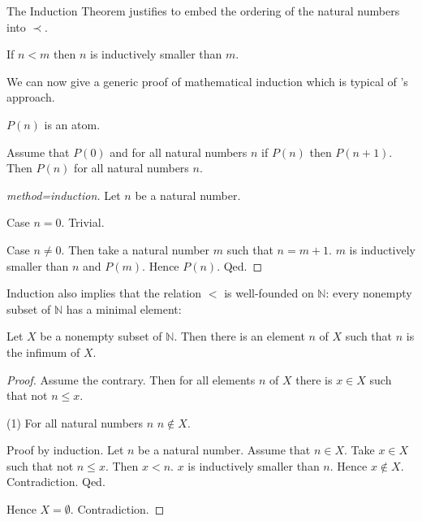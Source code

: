\documentclass{article}
\begin{document}
%
The Induction Theorem justifies to embed the ordering of the natural numbers
into $\prec$.
%
\begin{forthel}
\begin{axiom}
If $n < m$ then $n$ is inductively smaller than $m$.
\end{axiom}
\end{forthel}
We can now give a generic proof of mathematical induction which
is typical of \Naproche's approach.
\begin{forthel}
\begin{signature}
$P(n)$ is an atom.
\end{signature}

\begin{theorem}
Assume that $P(0)$ and for all natural numbers
$n$ if $P(n)$ then  $P(n+1)$.
Then $P(n)$ for all natural numbers $n$.
\end{theorem}
\begin{proof}[method=induction]
Let $n$ be a natural number.

Case $n = 0$. Trivial.

Case $n \neq 0$. Then take a natural number $m$ such that
$n = m + 1$. $m$ is inductively smaller than $n$ and $P(m)$.
Hence $P(n)$.
Qed.
\end{proof}
\end{forthel}

Induction also implies that the relation $<$ is
well-founded on $\mathbb{N}$: every nonempty subset
of $\mathbb{N}$ has a minimal element:

\begin{forthel}

\begin{theorem}
Let $X$ be a nonempty subset of $\mathbb{N}$.
Then there is an element $n$ of $X$ such that
$n$ is the infimum of $X$.
\end{theorem}
\begin{proof}
Assume the contrary. Then
for all elements $n$ of $X$ there
is $x \in X$ such that not $n \leq x$.

(1) For all natural numbers $n$ $n \notin X$.

Proof by induction.
Let $n$ be a natural number.
Assume that $n \in X$.
Take $x \in X$ such that not $n \leq x$.
Then $x < n$. $x$ is inductively smaller than $n$.
Hence $x \notin X$. Contradiction.
Qed.

Hence $X = \emptyset$. Contradiction.

\end{proof}
\end{forthel}
\end{document}
